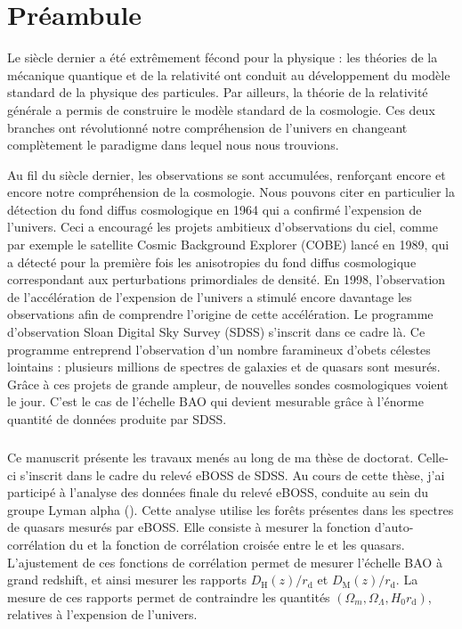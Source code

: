\chapter*{Préambule}
\thispagestyle{empty}

Le  siècle dernier a été extrêmement fécond pour la physique : les théories de la mécanique quantique et de la relativité ont conduit au développement du modèle standard de la physique des particules. Par ailleurs, la théorie de la relativité générale a permis de construire le modèle standard de la cosmologie. Ces deux branches ont révolutionné notre compréhension de l'univers en changeant complètement le paradigme dans lequel nous nous trouvions.

Au fil du siècle dernier, les observations se sont accumulées, renforçant encore et encore notre compréhension de la cosmologie. Nous pouvons citer en particulier la détection du fond diffus cosmologique en 1964 qui a confirmé l'expension de l'univers. Ceci a encouragé les projets ambitieux d'observations du ciel, comme par exemple le satellite Cosmic Background Explorer (COBE) lancé en 1989, qui a détecté pour la première fois les anisotropies du fond diffus cosmologique correspondant aux perturbations primordiales de densité.
En 1998, l'observation de l'accélération de l'expension de l'univers a stimulé encore davantage les observations afin de comprendre l'origine de cette accélération. Le programme d'observation Sloan Digital Sky Survey (SDSS) s'inscrit dans ce cadre là. Ce programme entreprend l'observation d'un nombre faramineux d'obets célestes lointains : plusieurs millions de spectres de galaxies et de quasars sont mesurés.
Grâce à ces projets de grande ampleur, de nouvelles sondes cosmologiques voient le jour. C'est le cas de l'échelle BAO qui devient mesurable grâce à l'énorme quantité de données produite par SDSS.

\paragraph{}
\thispagestyle{empty}
Ce manuscrit présente les travaux menés au long de ma thèse de doctorat. Celle-ci s'inscrit dans le cadre du relevé eBOSS de SDSS.
Au cours de cette thèse, j'ai participé à l'analyse des données finale du relevé eBOSS, conduite au sein du groupe Lyman alpha (\lya{}).
Cette analyse utilise les forêts \lya{} présentes dans les spectres de quasars mesurés par eBOSS.
Elle consiste à mesurer la fonction d'auto-corrélation du \lya{} et la fonction de corrélation croisée entre le \lya{} et les quasars.
L'ajustement de ces fonctions de corrélation permet de mesurer l'échelle BAO à grand redshift, et ainsi mesurer les rapports $D_{\mathrm{H}}(z) / r_{\mathrm{d}}$ et $D_{\mathrm{M}}(z) / r_{\mathrm{d}}$. La mesure de ces rapports permet de contraindre les quantités $(\Omega_{m} , \Omega_{\Lambda} , H_0 r_{\mathrm{d}})$, relatives à l'expension de l'univers.

